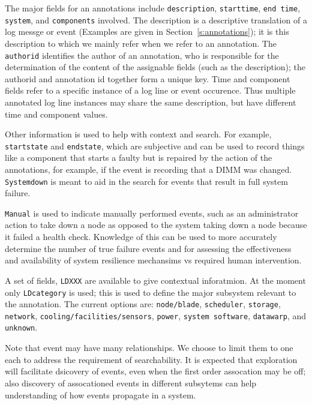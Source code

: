 The major fields for an annotations include \texttt{description}, \texttt{starttime}, \texttt{end time},
\texttt{system}, and \texttt{components} involved.
The description is a descriptive translation of a log messge or event (Examples
are given in Section~\ref{s:annotations}); it is this description to which we
mainly refer when we refer to an annotation.
The \texttt{authorid} identifies the author of an annotation, who
is responsible for the determination of the content of the assignable fields
(such as the description); the authorid and annotation id together form a unique key.
Time and component fields refer to a specific instance of a log line or event
occurence. Thus multiple annotated log line instances may share the same description,
but have different time and component values.

Other information is used to help with context and search.
For example, \texttt{startstate} and \texttt{endstate}, which
are subjective and can be used to record things like a component
that starts a faulty but is repaired by the action of the annotations,
for example, if the event is recording that a DIMM was changed.
\texttt{Systemdown} is meant to aid in the search for events that result
in full system failure.

\texttt{Manual} is used to indicate manually performed
events, such as an administrator action to take down a node as opposed
to the system taking down a node because it failed a health check.
Knowledge of this can be used to more accurately determine the
number of true failure events and for assessing the effectiveness
and availability of system resilience mechansims vs required
human intervention.

A set of fields, \texttt{LDXXX} are available to give contextual inforatmion.
At the moment only \texttt{LDcategory} is used; this is used to define the major
subsystem relevant to the annotation. The current options are: \texttt{node/blade},
\texttt{scheduler}, \texttt{storage}, \texttt{network}, \texttt{cooling/facilities/sensors},
\texttt{power}, \texttt{system software}, \texttt{datawarp}, and \texttt{unknown}.

Note that event may have many relationships. We choose to limit them to one each to address
the requirement of searchability. It is expected that exploration will facilitate dsicovery
of events, even when the first order assocation may be off; also discovery of assocationed
events in different subsytems can help understanding of how events propagate in a system.

